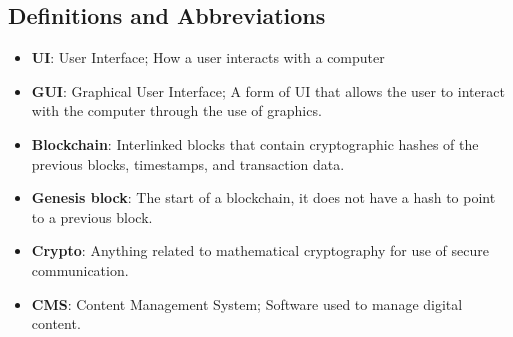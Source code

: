 \subsection{Definitions and Abbreviations}

\begin{itemize}
	\item \textbf{UI}: User Interface; How a user interacts with a computer
	\item \textbf{GUI}: Graphical User Interface; A form of UI that allows 
		  the user to interact with the computer through the use of graphics.
	\item \textbf{Blockchain}: Interlinked blocks that contain cryptographic hashes of the previous blocks,
							   timestamps, and transaction data.
	\item \textbf{Genesis block}: The start of a blockchain, it does not have a hash to point to a
								  previous block. 
 	\item \textbf{Crypto}: Anything related to mathematical cryptography for use of secure communication.
	\item \textbf{CMS}: Content Management System; Software used to manage digital content.
\end{itemize}
